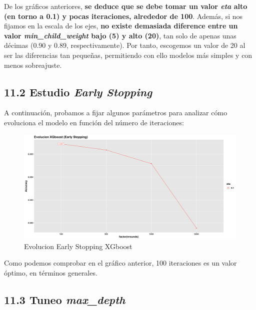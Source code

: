 \documentclass[
]{article}
\begin{document}
De los gráficos anteriores, \textbf{se deduce que se debe tomar un valor
\emph{eta} alto (en torno a 0.1) y pocas iteraciones, alrededor de 100}.
Además, si nos fijamos en la escala de los ejes, \textbf{no existe
demasiada diference entre un valor \emph{min\_child\_weight} bajo (5) y
alto (20)}, tan solo de apenas unas décimas (0.90 y 0.89,
respectivamente). Por tanto, escogemos un valor de 20 al ser las
diferencias tan pequeñas, permitiendo con ello modelos más simples y con
menos sobreajuste.

\hypertarget{estudio-early-stopping}{%
\subsection{\texorpdfstring{11.2 Estudio \emph{Early
Stopping}}{11.2 Estudio Early Stopping}}\label{estudio-early-stopping}}

A continuación, probamos a fijar algunos parámetros para analizar cómo
evoluciona el modelo en función del número de iteraciones:

\begin{figure}[h!]

{\centering \includegraphics[width=0.99\linewidth,height=0.99\textheight,]{./charts/xgboost/early_stopping} 

}

\caption{Evolucion Early Stopping XGboost}\label{fig:unnamed-chunk-132}
\end{figure}

Como podemos comprobar en el gráfico anterior, 100 iteraciones es un
valor óptimo, en términos generales.

\hypertarget{tuneo-max_depth}{%
\subsection{\texorpdfstring{11.3 Tuneo
\emph{max\_depth}}{11.3 Tuneo max\_depth}}\label{tuneo-max_depth}}
\end{document}
